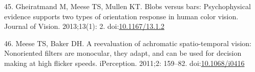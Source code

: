 \documentclass[
]{article}
\begin{document}
\leavevmode\hypertarget{ref-Gheiratmand2013}{}%
45. Gheiratmand M, Meese TS, Mullen KT. Blobs versus bars: Psychophysical evidence supports two types of orientation response in human color vision. Journal of Vision. 2013;13(1): 2. doi:\href{https://doi.org/10.1167/13.1.2}{10.1167/13.1.2}

\leavevmode\hypertarget{ref-Meese2011}{}%
46. Meese TS, Baker DH. A reevaluation of achromatic spatio-temporal vision: Nonoriented filters are monocular, they adapt, and can be used for decision making at high flicker speeds. iPerception. 2011;2: 159--82. doi:\href{https://doi.org/10.1068/i0416}{10.1068/i0416}
\end{document}
